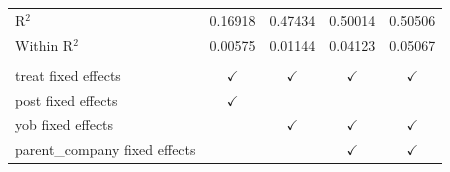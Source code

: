 \begin{table}[htbp]
\begin{tabular}{lcccc}
      R$^2$                          & 0.16918       & 0.47434        & 0.50014        & 0.50506\\  
      Within R$^2$                   & 0.00575       & 0.01144        & 0.04123        & 0.05067\\  
       \\
      treat fixed effects            & $\checkmark$  & $\checkmark$   & $\checkmark$   & $\checkmark$\\   
      post fixed effects             & $\checkmark$  &                &                & \\  
      yob fixed effects              &               & $\checkmark$   & $\checkmark$   & $\checkmark$\\   
      parent\_company fixed effects  &               &                & $\checkmark$   & $\checkmark$\\   
      \bottomrule
   \end{tabular}
\end{table}



